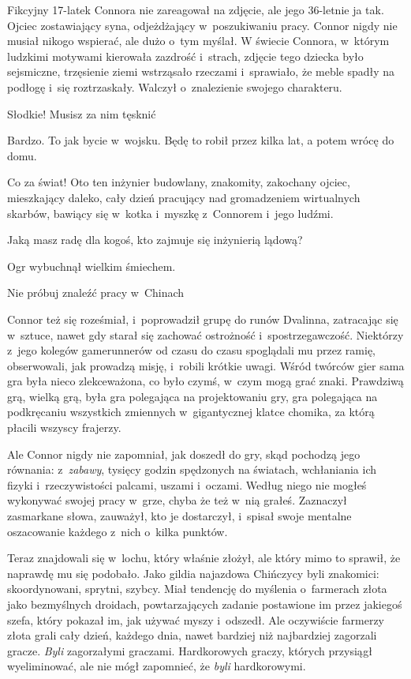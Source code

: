\documentclass[oneside,polish,11pt,rmheadings]{mwbk}
\begin{document}
Fikcyjny 17-latek Connora nie zareagował na zdjęcie, ale jego 36-letnie ja tak. Ojciec zostawiający syna, odjeżdżający w~poszukiwaniu pracy. Connor nigdy nie musiał nikogo wspierać, ale dużo o~tym myślał. W świecie Connora, w~którym ludzkimi motywami kierowała zazdrość i~strach, zdjęcie tego dziecka było sejsmiczne, trzęsienie ziemi wstrząsało rzeczami i~sprawiało, że meble spadły na podłogę i~się roztrzaskały. Walczył o~znalezienie swojego charakteru.

\noindent {\textgreater} Słodkie! Musisz za nim tęsknić

\noindent {\textgreater} Bardzo. To jak bycie w~wojsku. Będę to robił przez kilka lat, a potem wrócę do domu.

Co za świat! Oto ten inżynier budowlany, znakomity, zakochany ojciec, mieszkający daleko, cały dzień pracujący nad gromadzeniem wirtualnych skarbów, bawiący się w~kotka i~myszkę z~Connorem i~jego ludźmi.

\noindent {\textgreater} Jaką masz radę dla kogoś, kto zajmuje się inżynierią lądową?

Ogr wybuchnął wielkim śmiechem.

\noindent {\textgreater} Nie próbuj znaleźć pracy w~Chinach

Connor też się roześmiał, i~poprowadził grupę do runów Dvalinna, zatracając się w~sztuce, nawet gdy starał się zachować ostrożność i~spostrzegawczość. Niektórzy z~jego kolegów gamerunnerów od czasu do czasu spoglądali mu przez ramię, obserwowali, jak prowadzą misję, i~robili krótkie uwagi. Wśród twórców gier sama gra była nieco zlekceważona, co było czymś, w~czym mogą grać znaki. Prawdziwą grą, wielką grą, była gra polegająca na projektowaniu gry, gra polegająca na podkręcaniu wszystkich zmiennych w~gigantycznej klatce chomika, za którą płacili wszyscy frajerzy.

Ale Connor nigdy nie zapomniał, jak doszedł do gry, skąd pochodzą jego równania: z~\textit{zabawy}, tysięcy godzin spędzonych na światach, wchłaniania ich fizyki i~rzeczywistości palcami, uszami i~oczami. Według niego nie mogłeś wykonywać swojej pracy w~grze, chyba że też w~nią grałeś. Zaznaczył zasmarkane słowa, zauważył, kto je dostarczył, i~spisał swoje mentalne oszacowanie każdego z~nich o~kilka punktów.

Teraz znajdowali się w~lochu, który właśnie złożył, ale który mimo to sprawił, że naprawdę mu się podobało. Jako gildia najazdowa Chińczycy byli znakomici: skoordynowani, sprytni, szybcy. Miał tendencję do myślenia o~farmerach złota jako bezmyślnych droidach, powtarzających zadanie postawione im przez jakiegoś szefa, który pokazał im, jak używać myszy i~odszedł. Ale oczywiście farmerzy złota grali cały dzień, każdego dnia, nawet bardziej niż najbardziej zagorzali gracze. \textit{Byli }zagorzałymi graczami. Hardkorowych graczy, których przysiągł wyeliminować, ale nie mógł zapomnieć, że \textit{byli }hardkorowymi.
\end{document}
